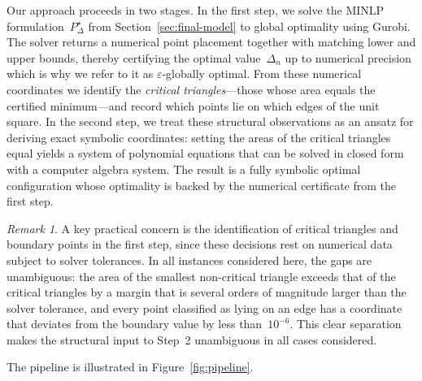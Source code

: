 \documentclass[11pt,a4paper]{article}
\theoremstyle{plain}
\theoremstyle{definition}
\theoremstyle{remark}
\newtheorem{remark}{Remark}
\begin{document}
Our approach proceeds in two stages.
In the first step, we solve the MINLP formulation~$P_\Delta^\star$ from Section~\ref{sec:final-model} to global optimality using Gurobi.
The solver returns a numerical point placement together with matching lower and upper bounds, thereby certifying the optimal value~$\Delta_n$ up to numerical precision which is
why we refer to it as $\varepsilon$-globally optimal.
From these numerical coordinates we identify the \emph{critical triangles}---those whose area equals the certified minimum---and record which points lie on which edges of the unit square.
In the second step, we treat these structural observations as an ansatz for deriving exact symbolic coordinates:
setting the areas of the critical triangles equal yields a system of polynomial equations that can be solved in closed form with a computer algebra system.
The result is a fully symbolic optimal configuration whose optimality is backed by the numerical certificate from the first step.
\begin{remark}
  A key practical concern is the identification of critical triangles and boundary points in the first step, since these decisions rest on numerical data subject to solver tolerances.
In all instances considered here, the gaps are unambiguous:
the area of the smallest non-critical triangle exceeds that of the critical triangles by a margin that is several orders of magnitude larger than the solver tolerance, and every point classified as lying on an edge has a coordinate that deviates from the boundary value by less than~$10^{-6}$. 
This clear separation makes the structural input to Step~2 unambiguous in all cases considered.
\end{remark}


The pipeline is illustrated in Figure~\ref{fig:pipeline}.
\end{document}
